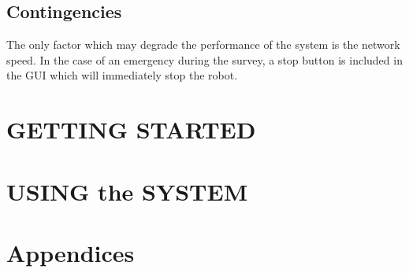 \documentclass[10pt,a4paper,titlepage]{article}
\begin{document}
        \subsection{Contingencies }
        The only factor which may degrade the performance of the system is the network speed. In the case of an emergency during the survey, a stop button is included in the GUI which will immediately stop the robot. 
    \newpage
	\section{GETTING STARTED}
	\newpage
	\section{USING the SYSTEM}
	\newpage
	\section{Appendices}
		
	
\end{document}
